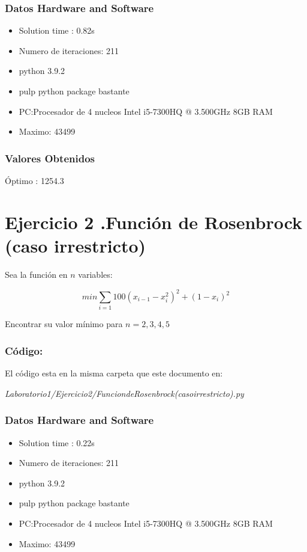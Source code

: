 \documentclass[]{article}
\begin{document}
\subsubsection*{Datos Hardware and Software}
\begin{itemize}
	\item Solution time  :   0.82s
	\item Numero de iteraciones: 211
	\item python 3.9.2  
	\item pulp python package bastante 
	\item PC:Procesador de 4 nucleos Intel i5-7300HQ @ 3.500GHz 8GB RAM
	\item Maximo: 43499
\end{itemize}

\subsubsection*{Valores Obtenidos }

\'Optimo : 1254.3

\section*{Ejercicio 2 .Funci\'on de Rosenbrock (caso irrestricto)}

\begin{flushleft}
	Sea la funci\'on en $n$ variables:
\end{flushleft}

$$ min \sum_{i=1} 100 \left(x_{i-1}- x_{i}^{2} \right)^{2} + \left(1-x_{i}\right)^{2} $$

\begin{flushleft}
	Encontrar su valor m\'inimo para $n = 2,3,4,5$ 
\end{flushleft}

\subsubsection*{C\'odigo:}

El c\'odigo esta en la misma carpeta que este documento en:

 \textit{ Laboratorio1/Ejercicio2/FunciondeRosenbrock(casoirrestricto).py}


\subsubsection*{Datos Hardware and Software}
\begin{itemize}
	\item Solution time  :   0.22s
	\item Numero de iteraciones: 211
	\item python 3.9.2  
	\item pulp python package bastante 
	\item PC:Procesador de 4 nucleos Intel i5-7300HQ @ 3.500GHz 8GB RAM
	\item Maximo: 43499
\end{itemize}
\end{document}
